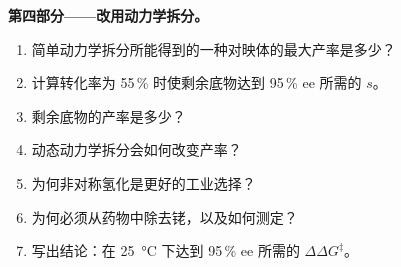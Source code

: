 \begin{problem}
\medskip\noindent\textbf{第四部分——改用动力学拆分。}
\begin{enumerate}[resume]
  \item 简单动力学拆分所能得到的一种对映体的最大产率是多少？
  \item 计算转化率为 55\,\% 时使剩余底物达到 95\,\% ee 所需的 $s$。
  \item 剩余底物的产率是多少？
  \item 动态动力学拆分会如何改变产率？
  \item 为何非对称氢化是更好的工业选择？
  \item 为何必须从药物中除去铑，以及如何测定？
  \item 写出结论：在 \qty{25}{\celsius} 下达到 95\,\% ee 所需的 $\Delta\Delta G^\ddagger$。
\end{enumerate}
\end{problem}
